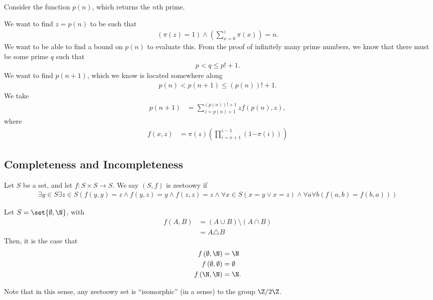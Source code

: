 \documentclass[10pt]{mypackage}
\begin{document}
\begin{example}
  Consider the function $p(n)$, which returns the $n$th prime.\newline

  We want to find $z = p(n)$ to be such that
  \begin{align*}
    \left(\pi(z) = 1\right) \wedge \left(\sum_{x=0}^{z}\pi(x)\right) = n.
  \end{align*}
  We want to be able to find a bound on $p(n)$ to evaluate this. From the proof of infinitely many prime numbers, we know that there must be some prime $q$ such that
  \begin{align*}
    p < q \leq p! + 1.
  \end{align*}
  We want to find $p(n+1)$, which we know is located somewhere along
  \begin{align*}
    p(n) < p\left(n+1\right) \leq \left(p(n)\right)! + 1.
  \end{align*}
  We take
  \begin{align*}
    p(n+1) &= \sum_{z=p(n)+ 1}^{\left(p(n)\right)! + 1} z f\left(p(n),z\right),
  \end{align*}
  where
  \begin{align*}
    f\left(x,z\right) &= \pi(z) \left( \prod_{i=x+1}^{z-1}\left(1\dot{-}\pi(i)\right)\right)
  \end{align*}
  
\end{example}

\subsection{Completeness and Incompleteness}%
\begin{definition}
Let $S$ be a set, and let $f: S\times S\rightarrow S$. We say $\left(S,f\right)$ is zeetoowy if
\begin{align*}
  \exists y\in S \exists z\in S \left(f\left(y,y\right) = z \wedge f\left(y,z\right) = y \wedge f\left(z,z\right) = z \wedge \forall x\in S\left(x=y \vee x = z\right) \wedge \forall a \forall b \left(f\left(a,b\right) = f\left(b,a\right)\right)\right)
\end{align*}
\end{definition}
\begin{example}
  Let $S = \set{\emptyset,\N}$, with
  \begin{align*}
    f\left(A,B\right) &= \left(A\cup B\right)\setminus \left(A\cap B\right)\\
                      &= A\triangle B
  \end{align*}
  Then, it is the case that
  \begin{align*}
    f\left(\emptyset,\N\right) &= \N\\
    f\left(\emptyset,\emptyset\right) &= \emptyset\\
    f\left(\N,\N\right) &= \N.
  \end{align*}
\end{example}
Note that in this sense, any zeetoowy set is ``isomorphic'' (in a sense) to the group $\Z/2\Z$.\newline
\end{document}

